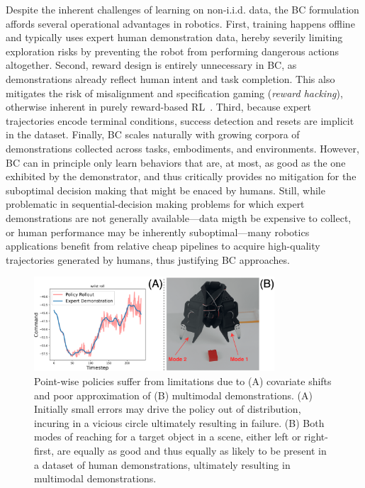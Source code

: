 Despite the inherent challenges of learning on non-i.i.d. data, the BC formulation affords several operational advantages in robotics.
First, training happens offline and typically uses expert human demonstration data, hereby severily limiting exploration risks by preventing the robot from performing dangerous actions altogether.
Second, reward design is entirely unnecessary in BC, as demonstrations already reflect human intent and task completion.
This also mitigates the risk of misalignment and specification gaming (\emph{reward hacking}), otherwise inherent in purely reward-based RL~\citep{heessEmergenceLocomotionBehaviours2017}.
Third, because expert trajectories encode terminal conditions, success detection and resets are implicit in the dataset.
Finally, BC scales naturally with growing corpora of demonstrations collected across tasks, embodiments, and environments.
However, BC can in principle only learn behaviors that are, at most, as good as the one exhibited by the demonstrator, and thus critically provides no mitigation for the suboptimal decision making that might be enaced by humans.
Still, while problematic in sequential-decision making problems for which expert demonstrations are not generally available---data migth be expensive to collect, or human performance may be inherently suboptimal---many robotics applications benefit from relative cheap pipelines to acquire high-quality trajectories generated by humans, thus justifying BC approaches.

\begin{figure}
    \centering
    \includegraphics[width=0.8\textwidth]{figures/ch4/ch4-issues-with-bc.png}
    \caption{Point-wise policies suffer from limitations due to (A) covariate shifts and poor approximation of (B) multimodal demonstrations. (A) Initially small errors may drive the policy out of distribution, incuring in a vicious circle ultimately resulting in failure. (B) Both modes of reaching for a target object in a scene, either left or right-first, are equally as good and thus equally as likely to be present in a dataset of human demonstrations, ultimately resulting in multimodal demonstrations.}
    \label{fig:ch4-issues-with-bc}
\end{figure}

